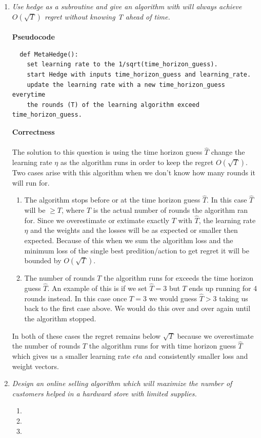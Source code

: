 \documentclass[12pt]{article}
\begin{document}
\begin{enumerate}
  \newpage
  \item \textit{Use hedge as a subroutine and give an algorithm with will
  always achieve $O(\sqrt{T})$ regret without knowing T ahead of time.}\\
  \\
  \textbf{Pseudocode}\\
  \begin{verbatim}
  def MetaHedge():
    set learning rate to the 1/sqrt(time_horizon_guess).
    start Hedge with inputs time_horizon_guess and learning_rate.
    update the learning rate with a new time_horizon_guess everytime 
    the rounds (T) of the learning algorithm exceed time_horizon_guess. 
  \end{verbatim}
  \textbf{Correctness}\\
  \\
  The solution to this question is using the time horizon guess $\hat{T}$ change
  the learning rate $\eta$ as the algorithm runs in order to keep the regret $O(\sqrt{T})$.  Two cases arise
  with this algorithm when we don't know how many rounds it will run for.
  \begin{enumerate}
    \item The algorithm stops before or at the time horizon guess
    $\hat{T}$.  In this case $\hat{T}$ will be $\ge T$, where $T$ is the
    actual number of rounds the algorithm ran for.  Since we overestimate or
    extimate exactly $T$ with $\hat{T}$, the learning rate $\eta$ and the
    weights and the losses will be as expected or smaller then expected. 
    Because of this when we sum the algorithm loss and the minimum loss of the
    single best predition/action to get regret it will be bounded by
    $O(\sqrt{T})$.
    \item The number of rounds $T$ the algorithm runs for exceeds the time
    horizon guess $\hat{T}$.  An example of this is if we set $\hat{T} = 3$ but
    $T$ ends up running for 4 rounds instead.  In this case once $T=3$ we would
    guess $\hat{T} > 3$ taking us back to the first case above.  We would do
    this over and over again until the algorithm stopped.
  \end{enumerate}
  In both of these cases the regret remains below $\sqrt{T}$ because we
  overestimate the number of rounds $T$ the algorithm runs for with
  time horizon guess $\hat{T}$ which gives us a smaller learning rate $eta$ and
  consistently smaller loss and weight vectors.
  \newpage
  \item \textit{Design an online selling algorithm which will maximize the
  number of customers helped in a hardward store with limited supplies.}
    \begin{enumerate}
      \item
      \item
      \item
    \end{enumerate}
    

\end{enumerate}
\end{document}

